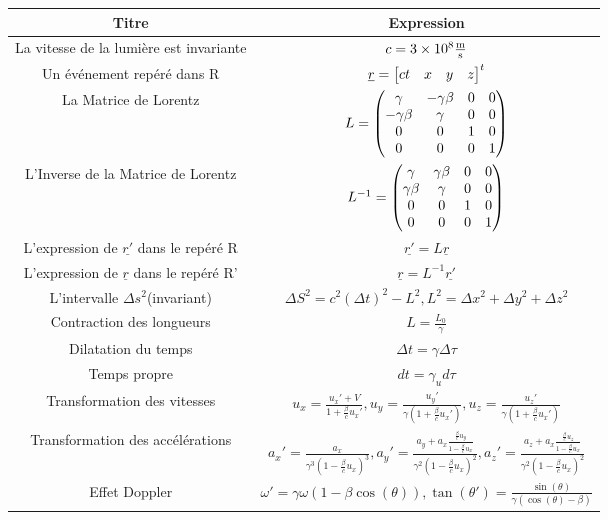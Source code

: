 \documentclass[french]{article}
\begin{document}
	\begin{center}
		\begin{tabular}{| c | c |}
			\hline
			\textbf{Titre} & \textbf{Expression}\\
			\hline
			La vitesse de la lumière est invariante&$c = 3\times10^8 \si{\frac{\meter}{\second}}$\\
			\hline
			Un événement repéré dans R&$ \underline{r}=\mqty[c t& x&y&z]^t $ \\
			\hline
			La Matrice de Lorentz &$L = \mqty(\gamma & -\gamma\beta & 0 & 0 \\ -\gamma\beta& \gamma&0&0\\0&0&1&0\\0&0&0&1)$\\
			\hline
			L'Inverse de la Matrice de Lorentz&$L^{-1} = \mqty(\gamma & \gamma\beta & 0 & 0 \\ \gamma\beta& \gamma&0&0\\0&0&1&0\\0&0&0&1)$\\
			\hline
			L'expression de $\underline{r'}$ dans le repéré R&$\underline{r'}=L\underline{r}$\\
			\hline
			L'expression de $\underline{r}$ dans le repéré R' &$\underline{r}=L^{-1}\underline{r'}$\\
			\hline
			L’intervalle $\Delta s ^2$(invariant)&$\Delta S^2=c^2 (\Delta t)^2-L^2, L^2=\Delta x ^2 +\Delta y ^2 + \Delta z ^2$\\
		\hline
		Contraction des longueurs&$L=\frac{L_0}{\gamma}$\\
		\hline
		Dilatation du temps&$\Delta t = \gamma \Delta \tau$ \\
		\hline
		Temps propre& $dt=\gamma_ud\tau$\\
		\hline
		Transformation des vitesses&$u_x = \frac{u_x'+V}{1 +\frac{\beta}{c}u_x'},
				 u_y = \frac{u_y'}{\gamma(1 +\frac{\beta}{c}u_x')}, 
				 u_z = \frac{u_z'}{\gamma(1 +\frac{\beta}{c}u_x')}$\\
		\hline
Transformation des accélérations&
	$a_x' = \frac{a_x}{\gamma^3\left(1 - \frac{\beta}{c}u_x\right)^3},
	a_y' = \frac{a_y + a_x \frac{\frac{\beta}{c}u_y}{1-\frac{\beta}{c}u_x}}{\gamma ^2\left(1-\frac{\beta}{c}u_x\right)^2}, 
		a_z' = \frac{a_z + a_x \frac{\frac{\beta}{c}u_z}{1-\frac{\beta}{c}u_x}}{\gamma ^2\left(1-\frac{\beta}{c}u_x\right)^2}$	
\\
\hline
Effet Doppler&$\omega'=\gamma\omega\left(1-\beta\cos(\theta)\right),
	\tan(\theta')= \frac{\sin(\theta)}{\gamma\left(\cos(\theta)-\beta\right)}$\\

\end{tabular}
\end{center}
\end{document}
